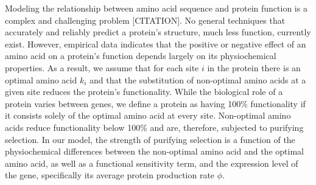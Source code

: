 \documentclass[13pt]{article}
\begin{document}

Modeling the relationship between amino acid sequence and protein function is a complex and challenging problem [CITATION].
No general techniques that accurately and reliably predict a protein's structure, much less function, currently exist.
However, empirical data indicates that the positive or negative effect of an amino acid on a protein's function depends largely on its physiochemical properties.
As a result, we assume that for each site $i$ in the protein there is an optimal amino acid $k_i$ and that the substitution of non-optimal amino acids at a given site reduces the protein's functionality.
While the biological role of a protein varies between genes, we define a protein as having 100\% functionality if it consists solely of the optimal amino acid at every site.
Non-optimal amino acids reduce functionality below 100\%  and are, therefore, subjected to purifying selection.
In our model, the strength of purifying selection is a function of the physiochemical differences between the non-optimal amino acid and the optimal amino acid, as well as a functional sensitivity term, and the expression level of the gene, specifically its average protein production rate $\phi$.
\end{document}
